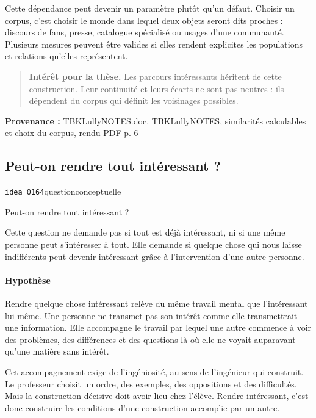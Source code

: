 \documentclass[10pt,a4paper]{article}
\begin{document}
Cette dépendance peut devenir un paramètre plutôt qu'un défaut. Choisir un corpus, c'est choisir le monde dans lequel deux objets seront dits proches : discours de fans, presse, catalogue spécialisé ou usages d'une communauté. Plusieurs mesures peuvent être valides si elles rendent explicites les populations et relations qu'elles représentent.

\begin{quote}
\textbf{Intérêt pour la thèse.} Les parcours intéressants héritent de cette construction. Leur continuité et leurs écarts ne sont pas neutres : ils dépendent du corpus qui définit les voisinages possibles.
\end{quote}
{\footnotesize\color{metadata}\textbf{Provenance :} TBKLullyNOTES.doc. TBKLullyNOTES, similarités calculables et choix du corpus, rendu PDF p. 6\par}

\subsection{Peut-on rendre tout intéressant ?}
{\small\color{metadata} \texttt{idea\_0164}\quad\textbullet\quad question\quad\textbullet\quad conceptuelle\par}

Peut-on rendre tout intéressant ?

Cette question ne demande pas si tout est déjà intéressant, ni si une même personne peut s'intéresser à tout. Elle demande si quelque chose qui nous laisse indifférents peut devenir intéressant grâce à l'intervention d'une autre personne.

\paragraph{Hypothèse}
Rendre quelque chose intéressant relève du même travail mental que l'intéressant lui-même. Une personne ne transmet pas son intérêt comme elle transmettrait une information. Elle accompagne le travail par lequel une autre commence à voir des problèmes, des différences et des questions là où elle ne voyait auparavant qu'une matière sans intérêt.

Cet accompagnement exige de l'ingéniosité, au sens de l'ingénieur qui construit. Le professeur choisit un ordre, des exemples, des oppositions et des difficultés. Mais la construction décisive doit avoir lieu chez l'élève. Rendre intéressant, c'est donc construire les conditions d'une construction accomplie par un autre.
\end{document}
